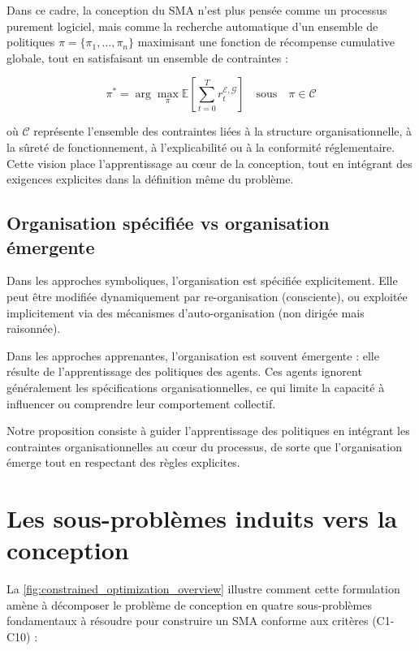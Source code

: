 Dans ce cadre, la conception du \ac{SMA} n'est plus pensée comme un processus purement logiciel, mais comme la recherche automatique d'un ensemble de politiques \(\pi = \{\pi_1, \dots, \pi_n\}\) maximisant une fonction de récompense cumulative globale, tout en satisfaisant un ensemble de contraintes :

\begin{equation}
    \pi^* = \arg\max_{\pi} \mathbb{E}\left[\sum_{t=0}^{T} r^{\mathcal{E},\mathcal{G}}_t\right] \quad \text{sous} \quad \pi \in \mathcal{C}
\end{equation}

où \(\mathcal{C}\) représente l'ensemble des contraintes liées à la structure organisationnelle, à la sûreté de fonctionnement, à l'explicabilité ou à la conformité réglementaire. Cette vision place l'apprentissage au cœur de la conception, tout en intégrant des exigences explicites dans la définition même du problème.


\subsection*{Organisation spécifiée vs organisation émergente}

Dans les approches symboliques, l'organisation est spécifiée explicitement. Elle peut être modifiée dynamiquement par re-organisation (consciente), ou exploitée implicitement via des mécanismes d'auto-organisation (non dirigée mais raisonnée).

Dans les approches apprenantes, l'organisation est souvent émergente : elle résulte de l'apprentissage des politiques des agents. Ces agents ignorent généralement les spécifications organisationnelles, ce qui limite la capacité à influencer ou comprendre leur comportement collectif.

Notre proposition consiste à guider l'apprentissage des politiques en intégrant les contraintes organisationnelles au cœur du processus, de sorte que l'organisation émerge tout en respectant des règles explicites.


\section{Les sous-problèmes induits vers la conception}

La \autoref{fig:constrained_optimization_overview} illustre comment cette formulation amène à décomposer le problème de conception en quatre sous-problèmes fondamentaux à résoudre pour construire un \ac{SMA} conforme aux critères (C1-C10) :

